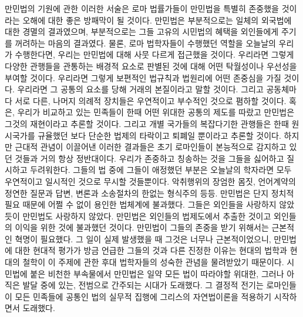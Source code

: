 만민법의 기원에 관한 이러한 서술은
로마 법률가들이 만민법을 특별히 존중했을 것이라는 오해에 대한
좋은 방패막이 될 것이다.
만민법은 부분적으로는 일체의 외국법에 대한 경멸의 결과였으며,
부분적으로는 그들 고유의 시민법의 혜택을 외인들에게 주기를 꺼려하는
마음의 결과였다.
물론, 로마 법학자들이 수행했던 역할을 오늘날의 우리가 수행한다면,
우리는 만민법에 대해 사뭇 다르게 접근했을 것이다.
우리라면 그렇게 다양한 관행들을 관통하는 배경적 요소로 판별된 것에 대해
어떤 탁월성이나 우선성을 부여할 것이다.
우리라면 그렇게 보편적인 법규칙과 법원리에 어떤 존중심을 가질 것이다.
우리라면 그 공통의 요소를 당해 거래의 본질이라고 말할 것이다.
그리고 공동체마다 서로 다른, 나머지 의례적 장치들은
우연적이고 부수적인 것으로 폄하할 것이다.
혹은, 우리가 비교하고 있는 민족들이 한때 어떤 위대한 공통의 제도를
따랐고 만민법은 그것의 재현이라고 추론할 것이다.
그리고 개별 국가들의 복잡다기한 관행들은 한때 원시국가를 규율했던
보다 단순한 법제의 타락이고 퇴폐일 뿐이라고 추론할 것이다.
하지만 근대적 관념이 이끌어낸 이러한 결과들은
초기 로마인들이 본능적으로 감지하고 있던 것들과
거의 항상 정반대이다.
우리가 존중하고 칭송하는 것을 그들을 싫어하고 질시하고 두려워한다.
그들의 법 중에 그들이 애정했던 부분은
오늘날의 학자라면 모두 우연적이고 일시적인 것으로 무시할 것들뿐이다.
악취행위의 장엄한 몸짓, 언어계약의 정연한 질문과 답변,
변론과 소송절차의 한없는 형식주의 등등.
만민법은 단지 정치적 필요 때문에 어쩔 수 없이 용인한 법체계에 불과했다.
그들은 외인들을 사랑하지 않았듯이 만민법도 사랑하지 않았다.
만민법은 외인들의 법제도에서 추출한 것이고 외인들의 이익을 위한 것에 불과했던
것이다.
만민법이 그들의 존중을 받기 위해서는 근본적인 혁명이 필요했다.
그 일이 실제 발생했을 때 그것은 너무나 근본적이었으니,
만민법에 대한 현대적 평가가 방금 언급한 그들의 것과 다른 진정한 이유는
현대의 법학과 현대의 철학이
이 주제에 관한 후대 법학자들의 성숙한 관념을
물려받았기 때문이다.
시민법에 붙은 비천한 부속물에서
만민법은 일약 모든 법이 따라야할 위대한, 그러나 아직은 발달 중에 있는,
전범으로 간주되는 시대가 도래했다.
그 결정적 전기는
로마인들이
모든 민족들에 공통인 법의 실무적 집행에
그리스의 자연법이론을
적용하기 시작하면서 도래했다.

